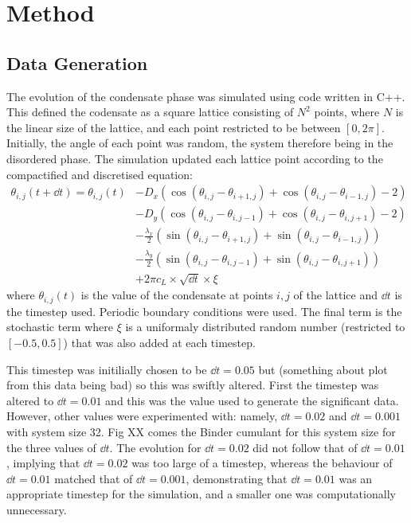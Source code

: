 \chapter{Method}

\section{Data Generation}

The evolution of the condensate phase was simulated using code written in C++. This defined the codensate as a square lattice consisting of $N^2$ points, where $N$ is the linear size of the lattice, and each point restricted to be between $[0, 2 \pi]$. Initially, the angle of each point was random, the system therefore being in the disordered phase. The simulation updated each lattice point according to the compactified and discretised equation:
\[
\begin{split}
\theta_{i,j}(t +\dd{t}) = \theta_{i,j}(t) &- D_x ( \cos(\theta_{i,j} - \theta_{i+1,j}) + \cos( \theta_{i,j} - \theta_{i-1,j}) - 2)\\
 					&- D_y(\cos(\theta_{i,j} - \theta_{i,j-1}) + \cos(\theta_{i,j} - \theta_{i,j+1}) - 2) \\
					& -\frac{\lambda_x}{2}(\sin(\theta_{i,j} - \theta_{i+1,j}) + \sin( \theta_{i,j} - \theta_{i-1,j}) ) \\ 
					& -\frac{\lambda_y}{2}(\sin(\theta_{i,j} - \theta_{i,j-1}) + \sin(\theta_{i,j} - \theta_{i,j+1})) \\
					& +2\pi c_L \times \sqrt{\dd{t}} \times \xi 
\end{split}
\]
where $\theta_{i,j}(t)$ is the value of the condensate at points $i,j$ of the lattice and $\dd{t}$ is the timestep used. Periodic boundary conditions were used. The final term is the stochastic term where $\xi$ is a uniformaly distributed random number (restricted to $[-0.5, 0.5]$) that was also added at each timestep. 

This timestep was initilially chosen to be $\dd{t}= 0.05$ but (something about plot from this data being bad) so this was swiftly altered. First the timestep was altered to $\dd{t}=0.01$ and this was the value used to generate the significant data. However, other values were experimented with: namely, $\dd{t} = 0.02$ and $\dd{t} = 0.001$ with system size 32. Fig XX comes the Binder cumulant for this system size for the three values of $\dd{t}$. The evolution for $\dd{t}=0.02$  did not follow that of $\dd{t}=0.01$, implying that $\dd{t}=0.02$ was too large of a timestep, whereas the behaviour of $\dd{t}=0.01$ matched that of $\dd{t}=0.001$, demonstrating that $\dd{t}=0.01$ was an appropriate timestep for the simulation, and a smaller one was computationally unnecessary. 

